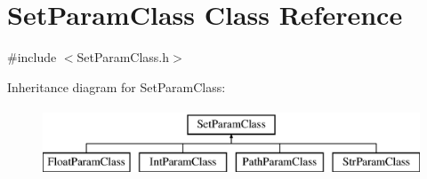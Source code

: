 \hypertarget{class_set_param_class}{}\section{Set\+Param\+Class Class Reference}
\label{class_set_param_class}


{\ttfamily \#include $<$Set\+Param\+Class.\+h$>$}

Inheritance diagram for Set\+Param\+Class\+:\begin{figure}[H]
\begin{center}
\leavevmode
\includegraphics[height=2.000000cm]{class_set_param_class}
\end{center}
\end{figure}
